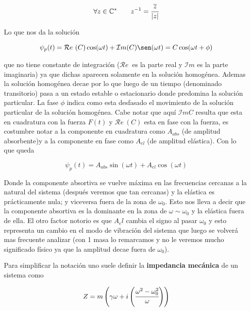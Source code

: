 \documentclass[a4paper,spanish]{article}
\def\Rea {\mathcal{R}e}
\def\Ima {\mathcal{I}m}
\def\C {\mathbb{C}}
\numberwithin{equation}{section}
\begin{document}
\[\forall z\in\C^{*} \qquad z^{-1}=\cfrac{\overline{z}}{\vert{z}\vert}\]

Lo que nos da la soluci\'on

	\begin{equation}
		\psi_p(t) = \Rea \ (C) \cos(\omega t) + \Ima (C) \sen(\omega t) = C \cos(\omega t + \phi)
		\label{eq:oscilador_forzado_particular_soluci\'on}
	\end{equation}
	
que no tiene constante de integraci\'on ($\Rea \ $ es la parte real y $\Ima$ es la parte imaginaria) ya que dichas aparecen solamente en la soluci\'on homog\'enea. Ademas la soluci\'on homog\'enea decae por lo que luego de un tiempo (denominado transitorio) pasa a un estado estable o estacionario donde predomina la soluci\'on particular. La fase $\phi$ indica como esta desfasado el movimiento de la soluci\'on particular de la soluci\'on homog\'enea. Cabe notar que aqu\'i $\Ima{C}$ resulta que esta en cuadratura con la fuerza $F(t)$  y $\Rea \ (C)$ esta en fase con la fuerza, es costumbre notar a la componente en cuadratura como $A_{abs}$ (de amplitud absorbente)y a la componente en fase como $A_{el}$ (de amplitud el\'astica). Con lo que queda

\begin{equation}
\psi_{p} (t)= A_{abs}\sin(\omega t)+A_{el}\cos(\omega t)
\label{solucion_particular_forzado}
\end{equation}

Donde la componente absortiva se vuelve m\'axima en las frecuencias cercanas a la natural del sistema (despu\'es veremos que tan cercanas) y la el\'astica es pr\'acticamente nula; y viceversa fuera de la zona de $\omega_0$. Esto nos lleva a decir que la componente absortiva es la dominante en la zona de $\omega \sim \omega_0$ y la el\'astica fuera de ella. El otro factor notorio es que $A_el$ cambia el signo al pasar $\omega_0$ y esto representa un cambio en el modo de vibraci\'on del sistema que luego se volver\'a mas frecuente analizar (con 1 masa lo remarcamos y no le veremos mucho significado f\'isico ya que la amplitud decae fuera de $\omega_0$).

Para simplificar la notaci\'on uno suele definir la \textbf{impedancia mec\'anica} de un sistema como

\begin{equation}
Z=m\left(\gamma\omega+i\left(\cfrac{\omega^2 - \omega_0 ^2}{\omega}\right)\right)
\label{definicion_impedancia}
\end{equation}
\end{document}
